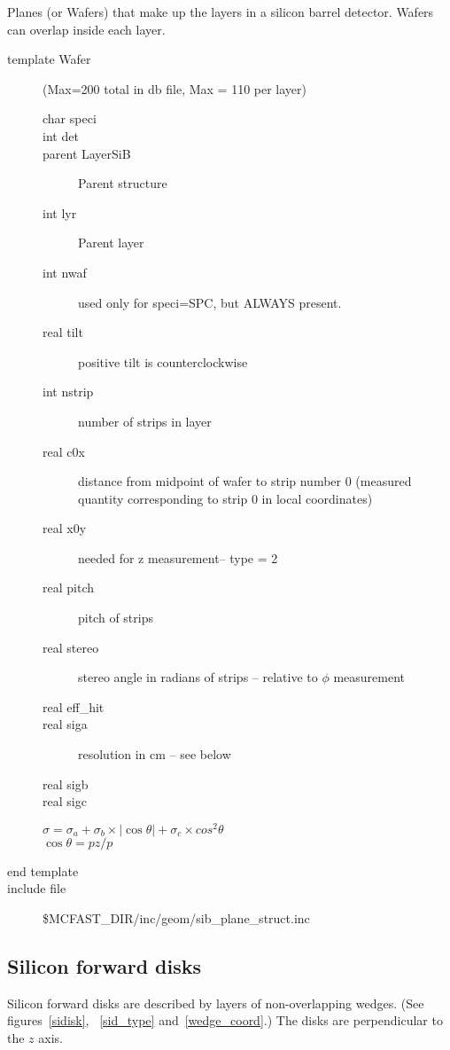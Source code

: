 \begin{itemize}
\begin{itemize}
Planes (or Wafers) that make up the layers in a silicon barrel detector.
Wafers can overlap inside each layer. 
  

\begin{description}
\item[{\rm template} Wafer](Max=200 total in db file, Max = 110 per layer)
\begin{description}
\item[{\rm  char} speci]
\item[{\rm  int} det]
\item[{\rm  parent} LayerSiB]  Parent structure
\item[{\rm  int} lyr]       Parent layer
\item[{\rm  int} nwaf]      used only for speci=SPC, but ALWAYS present.
\item[{\rm  real} tilt]     positive tilt is counterclockwise
\item[{\rm  int} nstrip]    number of strips in layer 
\item[{\rm  real} c0x]      distance from midpoint of wafer
to strip number 0  (measured quantity corresponding to strip 0 in local
coordinates)
\item[{\rm  real} x0y]      needed for z measurement-- type = 2
\item[{\rm  real} pitch]    pitch of strips
\item[{\rm  real} stereo]   stereo angle in radians of strips -- relative to $\phi$
measurement 
\item[{\rm  real} eff\_hit]
\item[{\rm  real} siga]  resolution in cm -- see below
\item[{\rm  real} sigb]
\item[{\rm  real} sigc]
\end{description}
$      \sigma = \sigma_a
           + \sigma_b \times |\cos \theta|
           + \sigma_c \times cos^2 \theta  $ \\
$     \cos\theta = pz/p$
\item[end template]
\item[include file] \$MCFAST\_DIR/inc/geom/sib\_plane\_struct.inc 
\end{description}
\end{itemize}
\end{itemize}

\filbreak

\subsection{Silicon forward disks}
Silicon forward disks are described by layers of non-overlapping wedges. 
(See figures~\ref{sidisk}, ~\ref{sid_type} and~\ref{wedge_coord}.)
The disks are perpendicular to the $z$ axis.  

